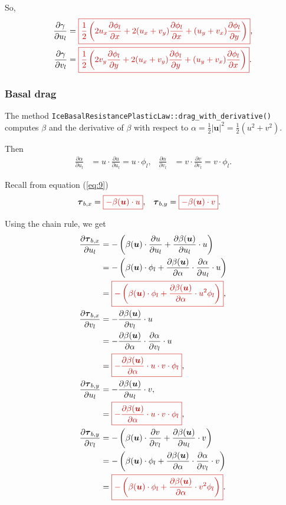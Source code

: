\documentclass{amsart}
\newcommand{\diff}[2]{\ensuremath{\frac{\partial #1}{\partial #2}}}
\newcommand{\betaU}{\beta(\boldsymbol{u})}
\newcommand{\basalshearstress}[1]{\boldsymbol{\tau}_{b#1}}
\newcommand{\taubx}{\basalshearstress{,x}}
\newcommand{\tauby}{\basalshearstress{,y}}
\newcommand{\highlight}[1]{{\color{red!80!black} \fbox{$ \displaystyle #1 $} }}
\begin{document}
So,
\begin{align}
  \diff{\gamma}{u_l} &= \highlight{ \frac{1}{2} \left( 2 u_x \diff{\phi_l}{x} + 2 (u_x + v_y)\diff{\phi_l}{x} + (u_y + v_x)\diff{\phi_l}{y} \right) },\\
  \diff{\gamma}{v_l} &= \highlight{ \frac{1}{2} \left( 2 v_y \diff{\phi_l}{y} + 2 (u_x + v_y)\diff{\phi_l}{y} + (u_y + v_x)\diff{\phi_l}{x} \right) }.
\end{align}


\subsubsection{Basal drag}
\label{sec:basal-drag}

The method \texttt{IceBasalResistancePlasticLaw::drag_with_derivative()} computes $\beta$ and the derivative of $\beta$ with respect to $\alpha = \frac12 |\boldsymbol{u}|^2 = \frac12 (u^2 + v^2)$.

Then
\begin{align*}
  \diff{\alpha}{u_l} &= u\cdot \diff{u}{u_l} = u\cdot \phi_l,&
  \diff{\alpha}{v_l} &= v\cdot \diff{v}{v_l} = v\cdot \phi_l.
\end{align*}

Recall from equation (\ref{eq:9})
\begin{align*}
  \taubx &=  \highlight{ - \betaU\cdot u }, &  \tauby &= \highlight{ - \betaU\cdot v }.
\end{align*}

Using the chain rule, we get
\begin{align*}
  \diff{\taubx}{u_l} &= -\left(\betaU\cdot \diff{u}{u_l} + \diff{\betaU}{u_l}\cdot u\right)\\
                     &= -\left( \betaU\cdot \phi_l + \diff{\betaU}{\alpha}\cdot \diff{\alpha}{u_l}\cdot u \right)\\
                     &= \highlight{ -\left( \betaU\cdot \phi_l + \diff{\betaU}{\alpha}\cdot u^2 \phi_l \right) },\\
  \diff{\taubx}{v_l} &= -\diff{\betaU}{v_l}\cdot u\\
                     &= -\diff{\betaU}{\alpha}\cdot \diff{\alpha}{v_l}\cdot u\\
                     &= \highlight{ -\diff{\betaU}{\alpha}\cdot u\cdot v \cdot \phi_l },\\
  \diff{\tauby}{u_l} &= -\diff{\betaU}{u_l}\cdot v,\\
                     &= \highlight{ -\diff{\betaU}{\alpha}\cdot u\cdot v \cdot \phi_l },\\
  \diff{\tauby}{v_l} &= -\left( \betaU\cdot \diff{v}{v_l} + \diff{\betaU}{u_l}\cdot v \right)\\
                     &= -\left( \betaU\cdot \phi_l + \diff{\betaU}{\alpha}\cdot \diff{\alpha}{v_l}\cdot v \right)\\
                     &= \highlight{ -\left( \betaU\cdot \phi_l + \diff{\betaU}{\alpha}\cdot v^2 \phi_l \right) }.
\end{align*}
\end{document}
